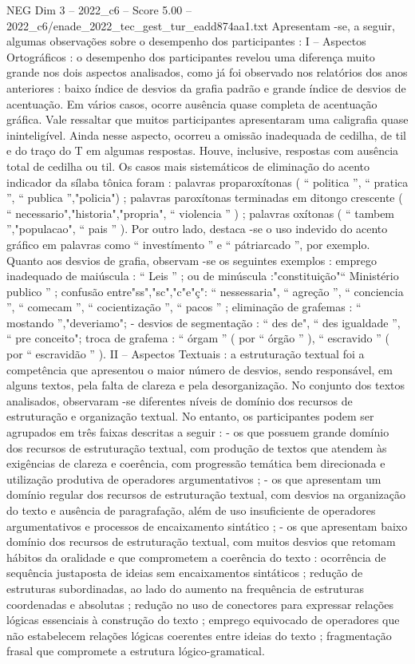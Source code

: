 \begin{textsample}{NEG Dim 3 – 2022\_c6 – Score 5.00 – 2022\_c6/enade\_2022\_tec\_gest\_tur\_eadd874aa1.txt}
Apresentam -se, a seguir, algumas observações sobre o desempenho dos participantes : I – Aspectos Ortográficos : o desempenho dos participantes revelou uma diferença muito grande nos dois aspectos analisados, como já foi observado nos relatórios dos anos anteriores : baixo índice de desvios da grafia padrão e grande índice de desvios de acentuação.
Em vários casos, ocorre ausência quase completa de acentuação gráfica.
Vale ressaltar que muitos participantes apresentaram uma caligrafia quase ininteligível.
Ainda nesse aspecto, ocorreu a omissão inadequada de cedilha, de til e do traço do T em algumas respostas.
Houve, inclusive, respostas com ausência total de cedilha ou til.
Os casos mais sistemáticos de eliminação do acento indicador da sílaba tônica foram : palavras proparoxítonas ( “ politica ”, “ pratica ”, “ publica ”,"policia") ; palavras paroxítonas terminadas em ditongo crescente ( “ necessario","historia","propria", “ violencia ” ) ; palavras oxítonas ( “ tambem ”,"populacao", “ pais ” ).
Por outro lado, destaca -se o uso indevido do acento gráfico em palavras como “ investímento ” e “ pátriarcado ”, por exemplo.
Quanto aos desvios de grafia, observam -se os seguintes exemplos : emprego inadequado de maiúscula : “ Leis ” ; ou de minúscula :"constituição"“ Ministério publico ” ; confusão entre"ss","sc","c"e"ç": “ nessessaria", “ agreção ”, “ conciencia ”, “ comecam ”, “ cocientização ”, “ pacos ” ; eliminação de grafemas : “ mostando ”,"deveriamo"; - desvios de segmentação : “ des de", “ des igualdade ”, “ pre conceito"; troca de grafema : “ órgam ” ( por “ órgão ” ), “ escravido ” ( por “ escravidão ” ).
II – Aspectos Textuais : a estruturação textual foi a competência que apresentou o maior número de desvios, sendo responsável, em alguns textos, pela falta de clareza e pela desorganização.
No conjunto dos textos analisados, observaram -se diferentes níveis de domínio dos recursos de estruturação e organização textual.
No entanto, os participantes podem ser agrupados em três faixas descritas a seguir : - os que possuem grande domínio dos recursos de estruturação textual, com produção de textos que atendem às exigências de clareza e coerência, com progressão temática bem direcionada e utilização produtiva de operadores argumentativos ; - os que apresentam um domínio regular dos recursos de estruturação textual, com desvios na organização do texto e ausência de paragrafação, além de uso insuficiente de operadores argumentativos e processos de encaixamento sintático ; - os que apresentam baixo domínio dos recursos de estruturação textual, com muitos desvios que retomam hábitos da oralidade e que comprometem a coerência do texto : ocorrência de sequência justaposta de ideias sem encaixamentos sintáticos ; redução de estruturas subordinadas, ao lado do aumento na frequência de estruturas coordenadas e absolutas ; redução no uso de conectores para expressar relações lógicas essenciais à construção do texto ; emprego equivocado de operadores que não estabelecem relações lógicas coerentes entre ideias do texto ; fragmentação frasal que compromete a estrutura lógico-gramatical.

\end{textsample}
